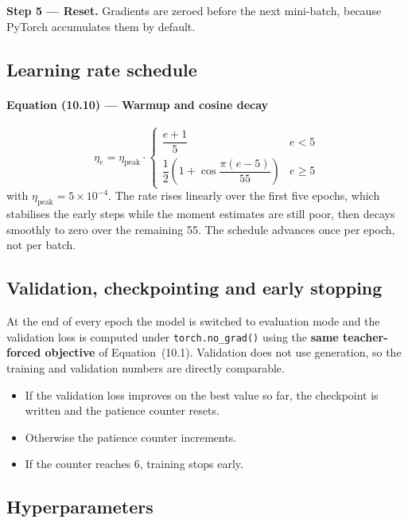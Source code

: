 \documentclass[12pt]{article}
\newcommand{\code}[1]{\texttt{#1}}
\begin{document}
\textbf{Step 5 --- Reset.} Gradients are zeroed before the next mini-batch, because PyTorch accumulates them by default.

\subsection{Learning rate schedule}

\paragraph{Equation (10.10) --- Warmup and cosine decay}
\begin{equation}
\eta_e = \eta_{\mathrm{peak}} \cdot
\begin{cases}
\dfrac{e+1}{5} & e < 5 \\[8pt]
\dfrac{1}{2}\left(1 + \cos\dfrac{\pi(e-5)}{55}\right) & e \ge 5
\end{cases}
\end{equation}
with $\eta_{\mathrm{peak}} = 5\times10^{-4}$. The rate rises linearly over the first five epochs, which stabilises the early steps while the moment estimates are still poor, then decays smoothly to zero over the remaining 55. The schedule advances once per epoch, not per batch.

\subsection{Validation, checkpointing and early stopping}

At the end of every epoch the model is switched to evaluation mode and the validation loss is computed under \code{torch.no\_grad()} using the \textbf{same teacher-forced objective} of Equation~(10.1). Validation does not use generation, so the training and validation numbers are directly comparable.

\begin{itemize}[nosep]
\item If the validation loss improves on the best value so far, the checkpoint is written and the patience counter resets.
\item Otherwise the patience counter increments.
\item If the counter reaches 6, training stops early.
\end{itemize}

\subsection{Hyperparameters}
\end{document}

